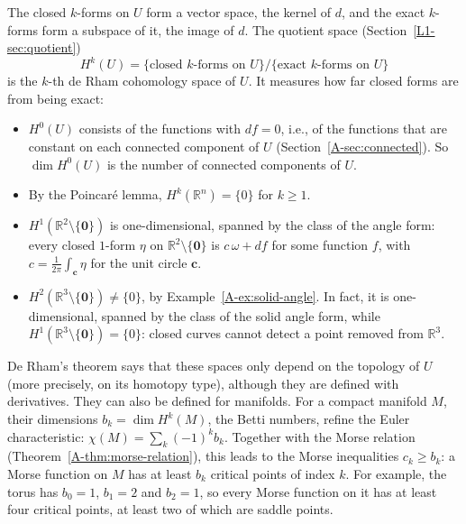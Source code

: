 The closed $k$-forms on $U$ form a vector space, the kernel of $d$, and the exact $k$-forms form a subspace of it, the image of $d$. The quotient space (Section~\ref{L1-sec:quotient})
\[H^k(U) = \{\text{closed } k\text{-forms on } U\} / \{\text{exact } k\text{-forms on } U\}\]
is the $k$-th de Rham cohomology space of $U$. It measures how far closed forms are from being exact:
\begin{itemize}
    \item $H^0(U)$ consists of the functions with $df = 0$, i.e., of the functions that are constant on each connected component of $U$ (Section~\ref{A-sec:connected}). So $\dim H^0(U)$ is the number of connected components of $U$.
    \item By the Poincar\'e lemma, $H^k(\mathbb{R}^n) = \{0\}$ for $k \geq 1$.
    \item $H^1(\mathbb{R}^2 \setminus \{\mathbf{0}\})$ is one-dimensional, spanned by the class of the angle form: every closed $1$-form $\eta$ on $\mathbb{R}^2 \setminus \{\mathbf{0}\}$ is $c\,\omega + df$ for some function $f$, with $c = \frac{1}{2\pi}\int_{\mathbf{c}} \eta$ for the unit circle $\mathbf{c}$.
    \item $H^2(\mathbb{R}^3 \setminus \{\mathbf{0}\}) \neq \{0\}$, by Example~\ref{A-ex:solid-angle}. In fact, it is one-dimensional, spanned by the class of the solid angle form, while $H^1(\mathbb{R}^3 \setminus \{\mathbf{0}\}) = \{0\}$: closed curves cannot detect a point removed from $\mathbb{R}^3$.
\end{itemize}
De Rham's theorem says that these spaces only depend on the topology of $U$ (more precisely, on its homotopy type), although they are defined with derivatives. They can also be defined for manifolds. For a compact manifold $M$, their dimensions $b_k = \dim H^k(M)$, the Betti numbers, refine the Euler characteristic: $\chi(M) = \sum_k (-1)^k b_k$. Together with the Morse relation (Theorem~\ref{A-thm:morse-relation}), this leads to the Morse inequalities $c_k \geq b_k$: a Morse function on $M$ has at least $b_k$ critical points of index $k$. For example, the torus has $b_0 = 1$, $b_1 = 2$ and $b_2 = 1$, so every Morse function on it has at least four critical points, at least two of which are saddle points.

